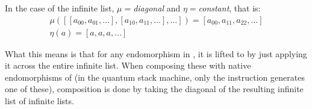 In the case of the infinite list, $\mu=$\emph{diagonal} 
and $\eta=$\emph{constant}, that is:
\begin{gather*}
\mu([[a_{00},a_{01},\ldots],[a_{10},a_{11},\ldots],\ldots]) = 
[a_{00},a_{11},a_{22},\ldots] \\
\eta(a) = [a,a,a,\ldots]
\end{gather*}

What this means is that for any endomorphism in \cms, it is  lifted to \ms{}
 by
just applying it across the entire infinite list. When composing these with 
native endomorphisms of \cms{} (in the quantum stack machine, 
only the  instruction generates
one of these), composition is done by
 taking the diagonal of the resulting infinite list of infinite lists.
